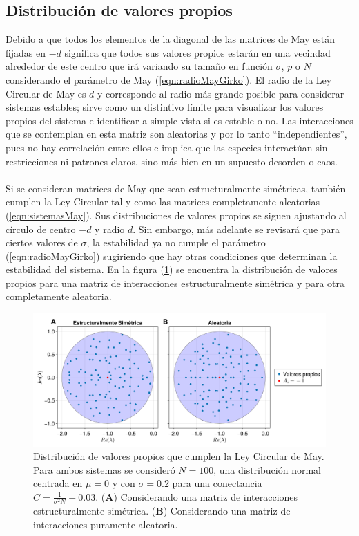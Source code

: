 \subsection{Distribución de valores propios}

Debido a que todos los elementos de la diagonal de las matrices de May están fijadas en $-d$ significa que todos sus valores propios estarán en una vecindad alrededor de este centro que irá variando su tamaño en función $\sigma$, $p$ o $N$ considerando el parámetro de May (\ref{eqn:radioMayGirko}). El radio de la Ley Circular de May es $d$ y corresponde al radio más grande posible para considerar sistemas estables; sirve como un distintivo límite para visualizar los valores propios del sistema e identificar a simple vista si es estable o no. Las interacciones que se contemplan en esta matriz son aleatorias y por lo tanto ``independientes'', pues no hay correlación entre ellos e implica que las especies interactúan sin restricciones ni patrones claros, sino más bien en un supuesto desorden o caos.\\
\\
Si se consideran matrices de May que sean estructuralmente simétricas, también cumplen la Ley Circular tal y como las matrices completamente aleatorias (\ref{eqn:sistemasMay}). Sus distribuciones de valores propios se siguen ajustando al círculo de centro $-d$ y radio $d$. Sin embargo, más adelante se revisará que para ciertos valores de $\sigma$, la estabilidad ya no cumple el parámetro (\ref{eqn:radioMayGirko}) sugiriendo que hay otras condiciones que determinan la estabilidad del sistema. En la figura (\ref{fig:LeyCircularMay}) se encuentra la distribución de valores propios para una matriz de interacciones estructuralmente simétrica y para otra completamente aleatoria. 
\begin{figure}[h!]
	\centering
	\includegraphics[scale=0.2]{../Imagenes/LeyCircularMay}
	\caption{Distribución de valores propios que cumplen la Ley Circular de May. Para ambos sistemas se consideró $N=100$, una distribución normal centrada en $\mu=0$ y con $\sigma=0.2$ para una conectancia $C=\frac{1}{\sigma^2 N}-0.03$. (\textbf{A}) Considerando una matriz de interacciones estructuralmente simétrica. (\textbf{B}) Considerando una matriz de interacciones puramente aleatoria.}
	\label{fig:LeyCircularMay}
\end{figure}

